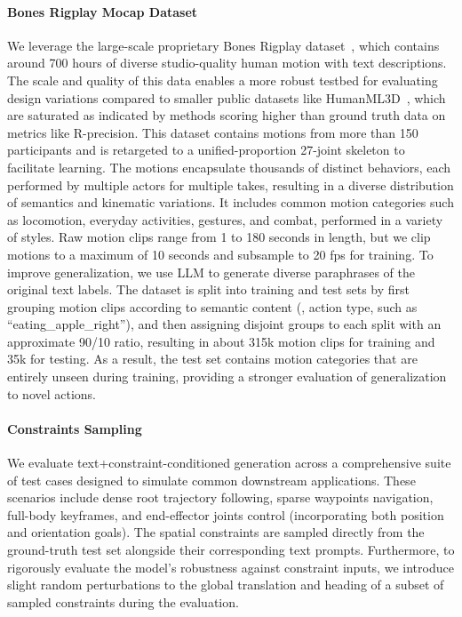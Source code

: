 \paragraph{Bones Rigplay Mocap Dataset}
We leverage the large-scale proprietary Bones Rigplay dataset~\cite{BonesStudio2026}, which contains around 700 hours of diverse studio-quality human motion with text descriptions.
The scale and quality of this data enables a more robust testbed for evaluating design variations compared to smaller public datasets like HumanML3D~\cite{guo2022humanml3d}, which are saturated as indicated by methods scoring higher than ground truth data on metrics like R-precision.
This dataset contains motions from more than 150 participants and is retargeted to a unified-proportion 27-joint skeleton to facilitate learning. The motions encapsulate thousands of distinct behaviors, each performed by multiple actors for multiple takes, resulting in a diverse distribution of semantics and kinematic variations. It includes common motion categories such as locomotion, everyday activities, gestures, and combat, performed in a variety of styles. Raw motion clips range from 1 to 180 seconds in length, but we clip motions to a maximum of 10 seconds and subsample to 20 fps for training. 
To improve generalization, we use LLM to generate diverse paraphrases of the original text labels. 
The dataset is split into training and test sets by first grouping motion clips according to semantic content (\ie, action type, such as ``eating\_apple\_right''), and then assigning disjoint groups to each split with an approximate 90/10 ratio, resulting in about 315k motion clips for training and 35k for testing. As a result, the test set contains motion categories that are entirely unseen during training, providing a stronger evaluation of generalization to novel actions.


\paragraph{Constraints Sampling}
We evaluate text+constraint-conditioned generation across a comprehensive suite of test cases designed to simulate common downstream applications. These scenarios include dense root trajectory following, sparse waypoints navigation, full-body keyframes, and end-effector joints control (incorporating both position and orientation goals). The spatial constraints are sampled directly from the ground-truth test set alongside their corresponding text prompts. Furthermore, to rigorously evaluate the model's robustness against constraint inputs, we introduce slight random perturbations to the global translation and heading of a subset of sampled constraints during the evaluation.

